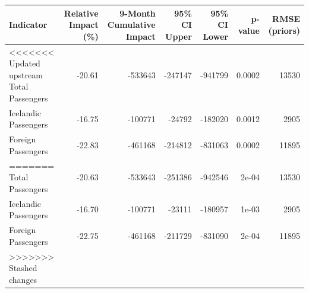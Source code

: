 
\begin{tabular}[t]{l|r|r|r|r|r|r}
\hline
Indicator & Relative Impact (\%) & 9-Month Cumulative Impact & 95\% CI Upper & 95\% CI Lower & p-value & RMSE (priors)\\
\hline
<<<<<<< Updated upstream
Total Passengers & -20.61 & -533643 & -247147 & -941799 & 0.0002 & 13530\\
\hline
Icelandic Passengers & -16.75 & -100771 & -24792 & -182020 & 0.0012 & 2905\\
\hline
Foreign Passengers & -22.83 & -461168 & -214812 & -831063 & 0.0002 & 11895\\
=======
Total Passengers & -20.63 & -533643 & -251386 & -942546 & 2e-04 & 13530\\
\hline
Icelandic Passengers & -16.70 & -100771 & -23111 & -180957 & 1e-03 & 2905\\
\hline
Foreign Passengers & -22.75 & -461168 & -211729 & -831090 & 2e-04 & 11895\\
>>>>>>> Stashed changes
\hline
\end{tabular}
